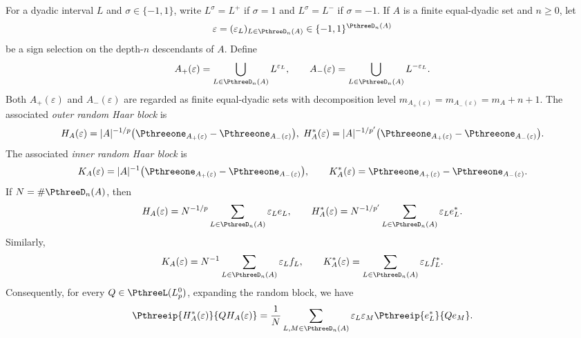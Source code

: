 \documentclass[11pt,reqno]{amsart}
\makeatletter
\theoremstyle{plain}
\theoremstyle{definition}
\newcounter{problempaper}
\newenvironment{problempaperbody}{%
  \setcounter{subsection}{0}%
  \setcounter{subsubsection}{0}%
  \setcounter{paragraph}{0}%
  \renewcommand{\thesubsection}{\arabic{subsection}}%
  \renewcommand{\thesubsubsection}{\thesubsection.\arabic{subsubsection}}%
  \renewcommand{\theparagraph}{\thesubsubsection.\arabic{paragraph}}%
  \let\problem@outersection\section
  \let\problem@outersubsection\subsection
  \let\problem@outersubsubsection\subsubsection
  \let\problem@outerparagraph\paragraph
  \let\section\problem@papersection
  \let\subsection\problem@papersubsection
  \let\subsubsection\problem@papersubsubsection
}{%
  \let\section\problem@outersection
  \let\subsection\problem@outersubsection
  \let\subsubsection\problem@outersubsubsection
  \let\paragraph\problem@outerparagraph
}
\newcommand{\problem@target}[2]{%
  \hypertarget{problem-\theproblempaper-#1-#2}{}%
}
\newcommand{\problem@paperheading}[3]{%
  \par\bigskip
  \problem@target{#1}{#2}%
  \noindent{\large\bfseries #2.\quad #3\par}%
  \nobreak\smallskip
}
\newcommand{\problem@papersubheading}[3]{%
  \par\medskip
  \problem@target{#1}{#2}%
  \noindent{\normalsize\bfseries #2.\quad #3\par}%
  \nobreak\smallskip
}
\newcommand{\problem@papersubsubheading}[3]{%
  \par\smallskip
  \problem@target{#1}{#2}%
  \noindent{\normalsize\itshape #2.\quad #3.\ }%
}
\def\problem@papersection{%
  \@ifstar{\problem@papersectionstar}{\problem@papersectionnostar}%
}
\def\problem@papersectionstar#1{%
  \par\bigskip\noindent{\large\bfseries #1\par}\nobreak\smallskip
}
\def\problem@papersectionnostar#1{%
  \refstepcounter{subsection}%
  \setcounter{subsubsection}{0}%
  \setcounter{paragraph}{0}%
  \problem@paperheading{section}{\thesubsection}{#1}%
  \problem@writecontentsline{section}{\thesubsection}{#1}%
}
\def\problem@papersubsection{%
  \@ifstar{\problem@papersubsectionstar}{\problem@papersubsectionnostar}%
}
\def\problem@papersubsectionstar#1{%
  \par\medskip\noindent{\normalsize\bfseries #1\par}\nobreak\smallskip
}
\def\problem@papersubsectionnostar#1{%
  \refstepcounter{subsubsection}%
  \setcounter{paragraph}{0}%
  \problem@papersubheading{subsection}{\thesubsubsection}{#1}%
  \problem@writecontentsline{subsection}{\thesubsubsection}{#1}%
}
\def\problem@papersubsubsection{%
  \@ifstar{\problem@papersubsubsectionstar}{\problem@papersubsubsectionnostar}%
}
\def\problem@papersubsubsectionstar#1{%
  \par\smallskip\noindent{\normalsize\itshape #1.\ }%
}
\def\problem@papersubsubsectionnostar#1{%
  \refstepcounter{paragraph}%
  \problem@papersubsubheading{subsubsection}{\theparagraph}{#1}%
  \problem@writecontentsline{subsubsection}{\theparagraph}{#1}%
}
\newcommand{\problem@writecontentsline}[3]{%
  \begingroup
  \protected@write\@auxout{}{%
    \string\problemcontentsentry{\theproblempaper}{#1}{#2}{#3}{\thepage}%
  }%
  \endgroup
}
\newcommand{\problemcontentsentry}[5]{%
  \@ifundefined{problemcontents@#1}{%
    \expandafter\gdef\csname problemcontents@#1\endcsname{}%
  }{}%
  \expandafter\g@addto@macro\csname problemcontents@#1\endcsname{%
    \problemcontentsline{#1}{#2}{#3}{#4}{#5}%
  }%
}
\newcommand{\problemcontentslink}[4]{%
  \hyperlink{problem-#1-#2-#3}{#4}%
}
\newcommand{\problemcontentsline}[5]{%
  \ifstrequal{#2}{section}{%
    \par\noindent
    \problemcontentslink{#1}{#2}{#3}{\makebox[2.5em][l]{#3}#4}%
    \nobreak\dotfill
    \problemcontentslink{#1}{#2}{#3}{#5}\par
  }{%
    \ifstrequal{#2}{subsection}{%
      \par\noindent\hspace*{1.5em}%
      \problemcontentslink{#1}{#2}{#3}{\makebox[3.5em][l]{#3}#4}%
      \nobreak\dotfill
      \problemcontentslink{#1}{#2}{#3}{#5}\par
    }{%
      \par\noindent\hspace*{3em}%
      \problemcontentslink{#1}{#2}{#3}{\makebox[4.5em][l]{#3}#4}%
      \nobreak\dotfill
      \problemcontentslink{#1}{#2}{#3}{#5}\par
    }%
  }%
}
\makeatother
\begin{document}
\begin{problempaperbody}
For a dyadic interval $L$ and $\sigma\in\{-1,1\}$, write $L^\sigma=L^+$ if $\sigma=1$ and $L^\sigma=L^-$ if $\sigma=-1$. If $A$ is a finite equal-dyadic set and $n\geq0$, let
\begin{equation*}
        \varepsilon=(\varepsilon_L)_{L\in\PthreeD_n(A)}\in\{-1,1\}^{\PthreeD_n(A)}
\end{equation*}
be a sign selection on the depth-$n$ descendants of $A$. Define
\begin{equation}
\label{p3:eq:random-split-sets}
        A_+(\varepsilon)=\bigcup_{L\in\PthreeD_n(A)}L^{\varepsilon_L},\qquad A_-(\varepsilon)=\bigcup_{L\in\PthreeD_n(A)}L^{-\varepsilon_L}.
\end{equation}
Both $A_+(\varepsilon)$ and $A_-(\varepsilon)$ are regarded as finite equal-dyadic sets with decomposition level $ m_{A_+(\varepsilon)}=m_{A_-(\varepsilon)} = m_A+n+1 $. The associated \emph{outer random Haar block} is
\begin{equation}
\label{p3:eq:outer-random-block-definition}
        H_A(\varepsilon)=|A|^{-1/p}\bigl(\Pthreeone_{A_+(\varepsilon)}-\Pthreeone_{A_-(\varepsilon)}\bigr), \hspace{3pt} H_A^*(\varepsilon)=|A|^{-1/p'}\bigl(\Pthreeone_{A_+(\varepsilon)}-\Pthreeone_{A_-(\varepsilon)}\bigr).
\end{equation}
The associated \emph{inner random Haar block} is
\begin{equation}
\label{p3:eq:inner-random-block-definition}
        K_A(\varepsilon)=|A|^{-1}\bigl(\Pthreeone_{A_+(\varepsilon)}-\Pthreeone_{A_-(\varepsilon)}\bigr),\qquad K_A^*(\varepsilon)=\Pthreeone_{A_+(\varepsilon)}-\Pthreeone_{A_-(\varepsilon)}.
\end{equation}
If $N=\#\PthreeD_n(A)$, then
\begin{equation}
\label{p3:eq:outer-random-block-expansion}
    H_A(\varepsilon)=N^{-1/p}\sum_{L\in\PthreeD_n(A)}\varepsilon_Le_L,\qquad H_A^*(\varepsilon)=N^{-1/p'}\sum_{L\in\PthreeD_n(A)}\varepsilon_Le_L^*.
\end{equation}
Similarly,
\begin{equation}
\label{p3:eq:inner-random-block-expansion}
        K_A(\varepsilon)=N^{-1}\sum_{L\in\PthreeD_n(A)}\varepsilon_Lf_L,\qquad K_A^*(\varepsilon)=\sum_{L\in\PthreeD_n(A)}\varepsilon_Lf_L^*.
\end{equation}
Consequently, for every $Q\in\PthreeL(L_p^0)$, expanding the random block, we have
\begin{equation*}
        \Pthreeip{H_A^*(\varepsilon)}{QH_A(\varepsilon)}=\frac1N\sum_{L,M\in\PthreeD_n(A)}\varepsilon_L\varepsilon_M\Pthreeip{e_L^*}{Qe_M}.

\end{equation*}
\end{problempaperbody}
\end{document}
